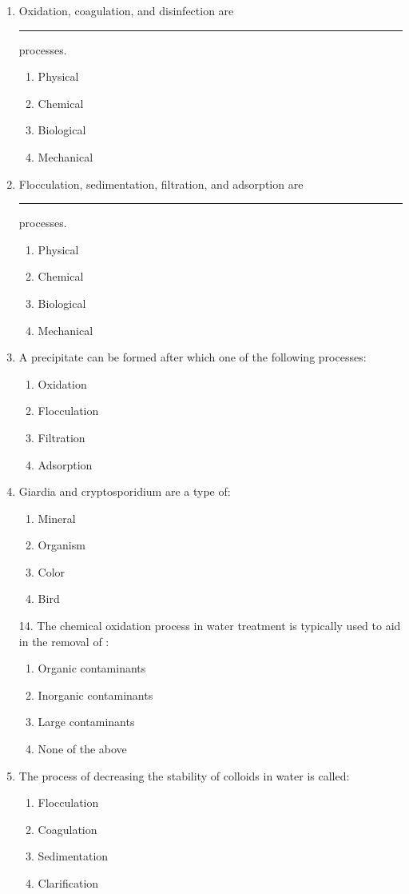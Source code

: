 \documentclass[10pt]{article}
\begin{document}
\begin{enumerate}
\begin{enumerate}
\item Oxidation, coagulation, and disinfection are \rule{1cm}{0.5pt}  processes.
\begin{enumerate}
\item Physical
\item Chemical
\item Biological
\item Mechanical
\end{enumerate}

\item Flocculation, sedimentation, filtration, and adsorption are \rule{1cm}{0.5pt} processes.
\begin{enumerate}
\item Physical
\item Chemical
\item Biological
\item Mechanical
\end{enumerate}

\item A precipitate can be formed after which one of the following processes:
\begin{enumerate}
\item Oxidation
\item Flocculation
\item Filtration
\item Adsorption
\end{enumerate}

\item Giardia and cryptosporidium are a type of:
\begin{enumerate}
\item Mineral
\item Organism
\item Color
\item Bird
\end{enumerate}

14. The chemical oxidation process in water treatment is typically used to aid in the
removal of :
\begin{enumerate}
\item Organic contaminants
\item Inorganic contaminants
\item Large contaminants
\item None of the above
\end{enumerate}

\item The process of decreasing the stability of colloids in water is called:
\begin{enumerate}
\item Flocculation
\item Coagulation
\item Sedimentation
\item Clarification
\end{enumerate}


\end{enumerate}
\end{enumerate}
\end{document}
